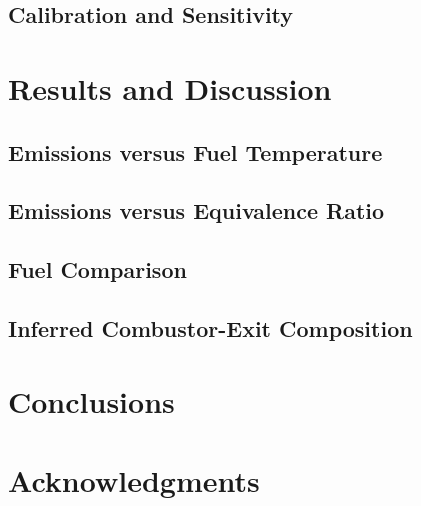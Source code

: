 \documentclass[balance,colorlinks]{asmeconf}
\begin{document}
\subsection{Calibration and Sensitivity}

\section{Results and Discussion}
\subsection{Emissions versus Fuel Temperature}
\subsection{Emissions versus Equivalence Ratio}
\subsection{Fuel Comparison}
\subsection{Inferred Combustor-Exit Composition}

\section{Conclusions}

\section*{Acknowledgments}



\end{document}
